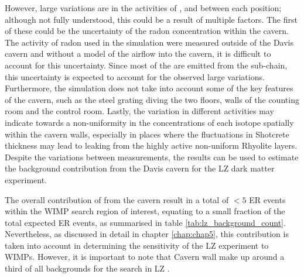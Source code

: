 

However, large variations are in the activities of \KFZ{}, \UTTE{} and \ThTTE{} between each position; although not fully understood, this could be a result of multiple factors. The first of these could be the uncertainty of the radon concentration within the cavern. The activity of radon used in the simulation were measured outside of the Davis cavern and without a model of the airflow into the cavern, it is difficult to account for this uncertainty. Since most of the \grays{} are emitted from the \RnTTT{} sub-chain, this uncertainty is expected to account for the observed large variations. Furthermore, the simulation does not take into account some of the key features of the cavern, such as the steel grating diving the two floors, walls of the counting room and the control room. Lastly, the variation in different activities may indicate towards a non-uniformity in the concentrations of each isotope spatially within the cavern walls, especially in places where the fluctuations in Shotcrete thickness may lead to \grays{} leaking from the highly active non-uniform Rhyolite layers. Despite the variations between measurements, the results can be used to estimate the background contribution from the Davis cavern for the LZ dark matter experiment.

The overall contribution of \grays{} from the cavern result in a total of $<5$ ER events within the WIMP search region of interest, equating to a small fraction of the total expected ER events, as summarised in table \ref{tab:lz_background_count}. Nevertheless, as discussed in detail in chapter \ref{chap:chap5}, this contribution is taken into account in determining the sensitivity of the LZ experiment to WIMPs. However, it is important to note that Cavern wall \grays{} make up around a third of all backgrounds for the \neutrinolessDoubleBeta{} search in LZ \cite{Akerib_2020_double_beta}.

